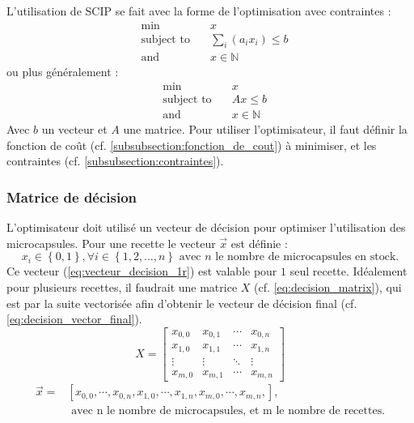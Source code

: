 L'utilisation de SCIP se fait avec la forme de l'optimisation avec contraintes :
\begin{align*}
    &\min\quad &x \\
    &\text{subject to}\quad &\sum_{i}\left( a_ix_i\right) \leq b \\
    &\text{and}\quad &x \in \mathbb{N}
\end{align*}
ou plus généralement : 
\begin{align*}
    &\min\quad &x \\
    &\text{subject to}\quad &Ax \leq b \\
    &\text{and}\quad &x \in \mathbb{N}
\end{align*}
Avec $b$ un vecteur et $A$ une matrice. Pour utiliser l'optimisateur, il faut définir la fonction de coût (cf. \autoref{subsubsection:fonction_de_cout}) à minimiser, et les contraintes (cf. \autoref{subsubsection:contraintes}).

\subsubsection{Matrice de décision}
L'optimisateur doit utilisé un vecteur de décision pour optimiser l'utilisation des microcapsules. Pour une recette le vecteur $\overrightarrow{x}$ est définie :
\begin{equation}
    x_{i}\in \left\{0, 1\right\}, \forall i\in\left\{1, 2, \dots, n\right\} \text{ avec } n\text{ le nombre de microcapsules en stock.}
    \label{eq:vecteur_decision_1r}
\end{equation}
Ce vecteur (\autoref{eq:vecteur_decision_1r}) est valable pour $1$ seul recette. Idéalement pour plusieurs recettes, il faudrait une matrice $X$ (cf. \autoref{eq:decision_matrix}), qui est par la suite \og vectorisée \fg afin d'obtenir le vecteur de décision final (cf. \autoref{eq:decision_vector_final}). 
\begin{equation}
    X = \left[
        \begin{array}{cccc}
            x_{0, 0} & x_{0, 1} & \cdots & x_{0, n} \\
            x_{1, 0} & x_{1, 1} & \cdots & x_{1, n} \\
            \vdots   & \vdots   & \ddots & \vdots \\
            x_{m, 0} & x_{m, 1} & \cdots & x_{m, n}
        \end{array}
        \right]
    \label{eq:decision_matrix}
\end{equation}
\begin{equation}
    \begin{split}
        \overrightarrow{x} = &\left[x_{0, 0}, \cdots, x_{0, n}, x_{1, 0}, \cdots, x_{1, n}, x_{m, 0}, \cdots, x_{m, n}, \right],\\ 
        &\text{ avec n le nombre de microcapsules, et m le nombre de recettes.}
    \end{split}
    \label{eq:decision_vector_final}
\end{equation}
